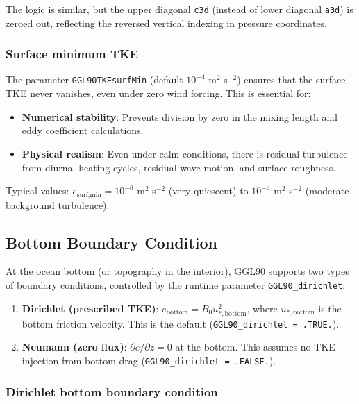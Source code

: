 \documentclass[12pt,letterpaper]{article}
\begin{document}
The logic is similar, but the upper diagonal \verb|c3d| (instead of lower diagonal \verb|a3d|) is zeroed out, reflecting the reversed vertical indexing in pressure coordinates.

\subsubsection{Surface minimum TKE}

The parameter \verb|GGL90TKEsurfMin| (default $10^{-4}$ m$^2$ s$^{-2}$) ensures that the surface TKE never vanishes, even under zero wind forcing. This is essential for:
\begin{itemize}
\item \textbf{Numerical stability}: Prevents division by zero in the mixing length and eddy coefficient calculations.
\item \textbf{Physical realism}: Even under calm conditions, there is residual turbulence from diurnal heating cycles, residual wave motion, and surface roughness.
\end{itemize}

Typical values: $e_{\text{surf,min}} = 10^{-6}$ m$^2$ s$^{-2}$ (very quiescent) to $10^{-4}$ m$^2$ s$^{-2}$ (moderate background turbulence).

\subsection{Bottom Boundary Condition}
\label{sec:bc_bottom}

At the ocean bottom (or topography in the interior), GGL90 supports two types of boundary conditions, controlled by the runtime parameter \verb|GGL90_dirichlet|:

\begin{enumerate}
\item \textbf{Dirichlet (prescribed TKE)}: $e_{\text{bottom}} = B_0 u_{*,\text{bottom}}^2$, where $u_{*,\text{bottom}}$ is the bottom friction velocity. This is the default (\verb|GGL90_dirichlet = .TRUE.|).
\item \textbf{Neumann (zero flux)}: $\partial e / \partial z = 0$ at the bottom. This assumes no TKE injection from bottom drag (\verb|GGL90_dirichlet = .FALSE.|).
\end{enumerate}

\subsubsection{Dirichlet bottom boundary condition}
\end{document}
